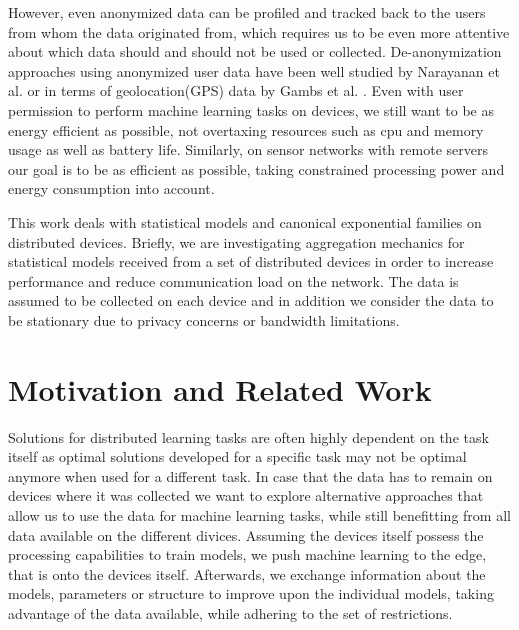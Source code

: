 However, even anonymized data can be profiled and tracked back to the users from whom the data originated from, which requires us to be even more attentive about which data should and should not be used or collected. 
De-anonymization approaches using anonymized user data have been well studied by Narayanan et al. \cite{narayanan2008robust} or in terms of geolocation(GPS) data by Gambs et al. \cite{gambs2014anonymization}.
Even with user  permission to perform machine learning tasks on devices, we still want to be as energy efficient as possible, not overtaxing resources such as cpu and memory usage as well as battery life.
Similarly, on sensor networks with remote servers our goal is to be as efficient as possible, taking constrained processing power and energy consumption into account.

This work deals with statistical models and canonical exponential families on distributed devices.
Briefly, we are investigating aggregation mechanics for statistical models received from a set of distributed devices in order to increase performance and reduce communication load on the network.
The data is assumed to be collected on each device and in addition we consider the data to be stationary due to privacy concerns or bandwidth limitations.

\section{Motivation and Related Work}
 
Solutions for distributed learning tasks are often highly dependent on the task itself as optimal solutions developed for a specific task may not be optimal anymore when used for a different task.
In case that the data has to remain on devices where it was collected we want to explore alternative approaches that allow us to use the data for machine learning tasks, while still benefitting from all data available on the different divices.
Assuming the devices itself possess the processing capabilities to train models, we push machine learning to the edge, that is onto the devices itself.
Afterwards, we exchange information about the models, parameters or structure to improve upon the individual models, taking advantage of the data available, while adhering to the set of restrictions.

